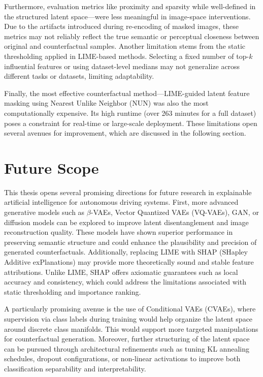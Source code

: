 Furthermore, evaluation metrics like proximity and sparsity while well-defined in the structured latent space—were less meaningful in image-space interventions. Due to the artifacts introduced during re-encoding of masked images, these metrics may not reliably reflect the true semantic or perceptual closeness between original and counterfactual samples. Another limitation stems from the static thresholding applied in LIME-based methods. Selecting a fixed number of top-$k$ influential features or using dataset-level medians may not generalize across different tasks or datasets, limiting adaptability. 

Finally, the most effective counterfactual method—LIME-guided latent feature masking using Nearest Unlike Neighbor (NUN) was also the most computationally expensive. Its high runtime (over 263 minutes for a full dataset) poses a constraint for real-time or large-scale deployment. These limitations open several avenues for improvement, which are discussed in the following section.

\section{Future Scope} \label{sec:future_scope}

This thesis opens several promising directions for future research in explainable artificial intelligence for autonomous driving systems. First, more advanced generative models such as $\beta$-VAEs, Vector Quantized VAEs (VQ-VAEs), GAN, or diffusion models can be explored to improve latent disentanglement and image reconstruction quality. These models have shown superior performance in preserving semantic structure and could enhance the plausibility and precision of generated counterfactuals. Additionally, replacing LIME with SHAP (SHapley Additive exPlanations) may provide more theoretically sound and stable feature attributions. Unlike LIME, SHAP offers axiomatic guarantees such as local accuracy and consistency, which could address the limitations associated with static thresholding and importance ranking.

A particularly promising avenue is the use of Conditional VAEs (CVAEs), where supervision via class labels during training would help organize the latent space around discrete class manifolds. This would support more targeted manipulations for counterfactual generation. Moreover, further structuring of the latent space can be pursued through architectural refinements such as tuning KL annealing schedules, dropout configurations, or non-linear activations to improve both classification separability and interpretability.

